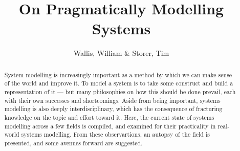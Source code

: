\documentclass{tufte-handout}
\title{On Pragmatically Modelling Systems}
\author{Wallis, William \& Storer, Tim}
\date{}
\begin{document}
\maketitle

\begin{abstract}
  System modelling is increasingly important as a method by which we can make
  sense of the world and improve it. To model a system is to take some construct
  and build a representation of it --- but many philosophies on how this should
  be done prevail, each with their own successes and shortcomings. Aside from
  being important, systems modelling is also deeply interdisciplinary, which has
  the consequence of fracturing knowledge on the topic and effort toward it.
  Here, the current state of systems modelling across a few fields is compiled,
  and examined for their practicality in real-world systems modelling. From
  these observartions, an autopsy of the field is presented, and some avenues
  forward are suggested.
\end{abstract}













\end{document}
